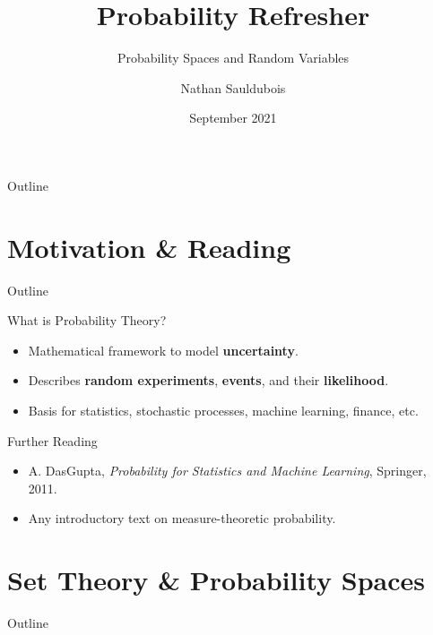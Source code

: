 \documentclass[aspectratio=169]{beamer}
\title{Probability Refresher}
\subtitle{Probability Spaces and Random Variables}
\author{Nathan Sauldubois}
\institute{NYU Tandon School, Finance and Risk Engineering}
\date{September 2021} %
\begin{document}
\maketitle

\begin{frame}{Outline}
  \tableofcontents[hideallsubsections]
\end{frame}

\section{Motivation \& Reading}

\begin{frame}{Outline}
\end{frame}

\begin{frame}{What is Probability Theory?}
\begin{itemize}
  \item Mathematical framework to model \textbf{uncertainty}.
  \item Describes \textbf{random experiments}, \textbf{events}, and their \textbf{likelihood}.
  \item Basis for statistics, stochastic processes, machine learning, finance, etc.
\end{itemize}
\end{frame}

\begin{frame}{Further Reading}
\begin{itemize}
  \item A. DasGupta, \textit{Probability for Statistics and Machine Learning}, Springer, 2011.
  \item Any introductory text on measure-theoretic probability.
\end{itemize}
\end{frame}

\section{Set Theory \& Probability Spaces}

\begin{frame}{Outline}
\end{frame}
\end{document}

